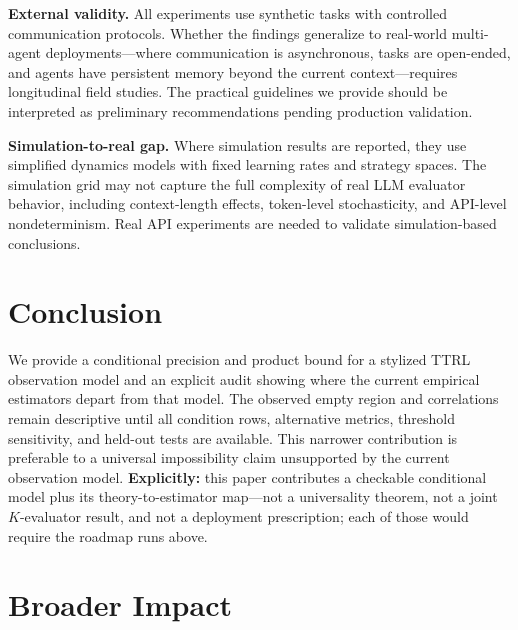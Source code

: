 \documentclass[11pt]{article}
\begin{document}
\textbf{External validity.} All experiments use synthetic tasks with controlled communication protocols. Whether the findings generalize to real-world multi-agent deployments—where communication is asynchronous, tasks are open-ended, and agents have persistent memory beyond the current context—requires longitudinal field studies. The practical guidelines we provide should be interpreted as preliminary recommendations pending production validation.

\textbf{Simulation-to-real gap.} Where simulation results are reported, they use simplified dynamics models with fixed learning rates and strategy spaces. The simulation grid may not capture the full complexity of real LLM evaluator behavior, including context-length effects, token-level stochasticity, and API-level nondeterminism. Real API experiments are needed to validate simulation-based conclusions.

\section{Conclusion}

We provide a conditional precision and product bound for a stylized TTRL observation model and an explicit audit showing where the current empirical estimators depart from that model. The observed empty region and correlations remain descriptive until all condition rows, alternative metrics, threshold sensitivity, and held-out tests are available. This narrower contribution is preferable to a universal impossibility claim unsupported by the current observation model. \textbf{Explicitly:} this paper contributes a checkable conditional model plus its theory-to-estimator map---not a universality theorem, not a joint $K$-evaluator result, and not a deployment prescription; each of those would require the roadmap runs above.

\section*{Broader Impact}
\end{document}
